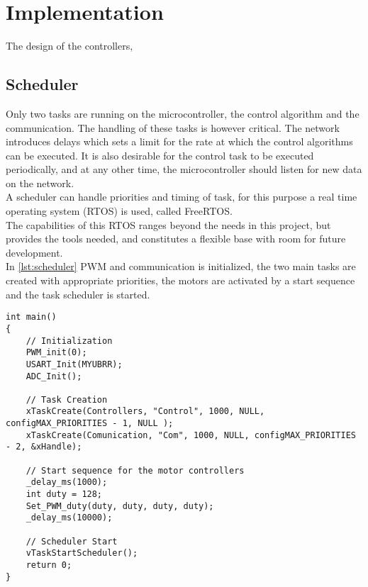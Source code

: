 \chapter{Implementation}

The design of the controllers,  



\section{Scheduler}
Only two tasks are running on the microcontroller, the control algorithm and the communication. The handling of these tasks is however critical. The network introduces delays which sets a limit for the rate at which the control algorithms can be executed. It is also desirable for the control task to be executed periodically, and at any other time, the microcontroller should listen for new data on the network.\\
A scheduler can handle priorities and timing of task, for this purpose a real time operating system (RTOS) is used, called FreeRTOS.\\
The capabilities of this RTOS ranges beyond the needs in this project, but provides the tools needed, and constitutes a flexible base with room for future development.\\
In \autoref{lst:scheduler} PWM and communication is initialized, the two main tasks are created with appropriate priorities, the motors are activated by a start sequence and the task scheduler is started.

\begin{lstlisting}[style=customcpp,
                    caption={Code for initialization, creation of the different tasks, start sequence for the motors and call to the scheduler.}, 
                    label=lst:scheduler]
int main()
{
    // Initialization
    PWM_init(0);
    USART_Init(MYUBRR);
    ADC_Init();
    
    // Task Creation
    xTaskCreate(Controllers, "Control", 1000, NULL, configMAX_PRIORITIES - 1, NULL );
    xTaskCreate(Comunication, "Com", 1000, NULL, configMAX_PRIORITIES - 2, &xHandle);
    
    // Start sequence for the motor controllers
    _delay_ms(1000);
    int duty = 128;
    Set_PWM_duty(duty, duty, duty, duty);
    _delay_ms(10000);
 
    // Scheduler Start
    vTaskStartScheduler();
    return 0;
}
\end{lstlisting}


